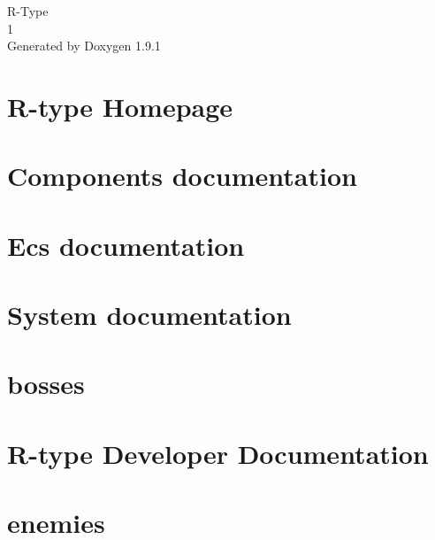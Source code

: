 \let\mypdfximage\pdfximage\def\pdfximage{\immediate\mypdfximage}\documentclass[twoside]{book}
\newcommand{\+}{\discretionary{\mbox{\scriptsize$\hookleftarrow$}}{}{}}
\newcommand{\clearemptydoublepage}{%
  \newpage{\pagestyle{empty}\cleardoublepage}%
}
\begin{document}
\raggedbottom

\hypersetup{pageanchor=false,
             bookmarksnumbered=true,
             pdfencoding=unicode
            }
\begin{titlepage}
\vspace*{7cm}
\begin{center}%
{\Large R-\/\+Type \\[1ex]\large 1 }\\
\vspace*{1cm}
{\large Generated by Doxygen 1.9.1}\\
\end{center}
\end{titlepage}
\clearemptydoublepage
{}
\tableofcontents
\clearemptydoublepage
{}
\hypersetup{pageanchor=true}

\chapter{R-\/type Homepage}
\label{index}\hypertarget{index}{}
\chapter{Components documentation}
\label{md_ecs_components}

\chapter{Ecs documentation}
\label{md_ecs_ecs}

\chapter{System documentation}
\label{md_ecs_system}

\chapter{bosses}
\label{md_bosses}

\chapter{R-\/type Developer Documentation}
\label{md_devdoc}

\chapter{enemies}
\label{md_enemies}

\end{document}
